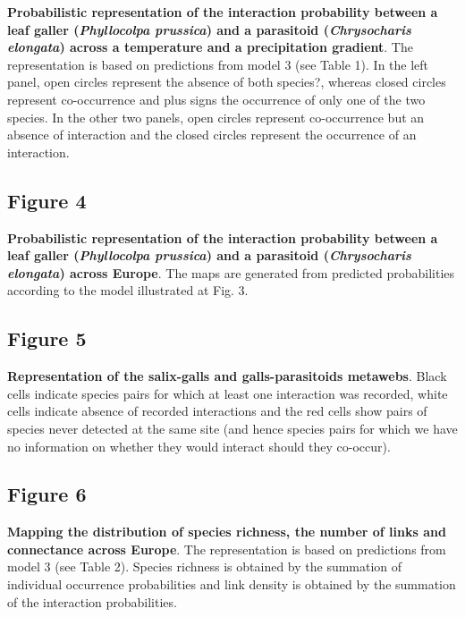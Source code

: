 \documentclass[12pt]{article}
\begin{document}
\textbf{Probabilistic representation of the interaction probability between a
leaf galler (\textit{Phyllocolpa prussica}) and a parasitoid
(\textit{Chrysocharis elongata}) across a temperature and a precipitation
gradient}.  The representation is based on predictions from model 3 (see Table
1). In the left panel, open circles represent the absence of both species?,
whereas closed circles represent co-occurrence and plus signs the occurrence
of only one of the two species. In the other two panels, open circles
represent co-occurrence but an absence of interaction and the closed circles
represent the occurrence of an interaction.

\subsection*{Figure 4}

\textbf{Probabilistic representation of the interaction probability between a
leaf galler (\textit{Phyllocolpa prussica}) and a parasitoid
(\textit{Chrysocharis elongata}) across Europe}.  The maps are generated from
predicted probabilities according to the model illustrated at Fig. 3.

\subsection*{Figure 5}

\textbf{Representation of the salix-galls and galls-parasitoids metawebs}.
Black cells indicate species pairs for which at least one interaction was
recorded, white cells indicate absence of recorded interactions and the red
cells show pairs of species never detected at the same site (and hence species
pairs for which we have no information on whether they would interact should
they co-occur).

\subsection*{Figure 6}

\textbf{Mapping the distribution of species richness, the number of links and
connectance across Europe}.  The representation is based on predictions from
model 3 (see Table 2). Species richness is obtained by the summation of
individual occurrence probabilities and link density is obtained by the
summation of the interaction probabilities. 

\newpage
\end{document}
